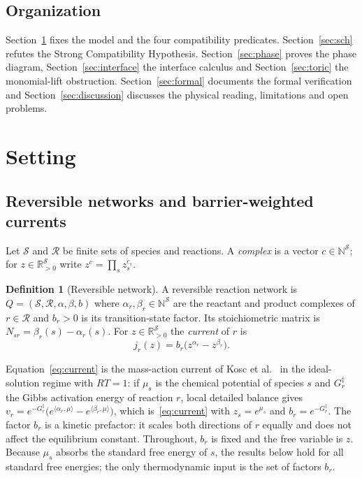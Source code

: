 \documentclass[11pt,a4paper]{article}
\theoremstyle{plain}
\theoremstyle{definition}
\newtheorem{definition}[theorem]{Definition}
\theoremstyle{remark}
\newcommand{\R}{\mathbb{R}}
\newcommand{\N}{\mathbb{N}}
\newcommand{\Rpos}{\R_{>0}}
\newcommand{\cS}{\mathcal{S}}
\newcommand{\cR}{\mathcal{R}}
\begin{document}
\subsection{Organization}

Section~\ref{sec:setting} fixes the model and the four compatibility predicates. Section~\ref{sec:sch} refutes the Strong Compatibility Hypothesis. Section~\ref{sec:phase} proves the phase diagram, Section~\ref{sec:interface} the interface calculus and Section~\ref{sec:toric} the monomial-lift obstruction. Section~\ref{sec:formal} documents the formal verification and Section~\ref{sec:discussion} discusses the physical reading, limitations and open problems.

\section{Setting}\label{sec:setting}

\subsection{Reversible networks and barrier-weighted currents}

Let $\cS$ and $\cR$ be finite sets of species and reactions. A \emph{complex} is a vector $c\in\N^{\cS}$; for $z\in\Rpos^{\cS}$ write $z^{c}=\prod_{s}z_s^{c_s}$.

\begin{definition}[Reversible network]\label{def:crn}
A reversible reaction network is $Q=(\cS,\cR,\alpha,\beta,b)$ where $\alpha_r,\beta_r\in\N^{\cS}$ are the reactant and product complexes of $r\in\cR$ and $b_r>0$ is its transition-state factor. Its stoichiometric matrix is $N_{sr}=\beta_r(s)-\alpha_r(s)$. For $z\in\Rpos^{\cS}$ the \emph{current} of $r$ is
\begin{equation}\label{eq:current}
  j_r(z)=b_r\bigl(z^{\alpha_r}-z^{\beta_r}\bigr).
\end{equation}
\end{definition}

Equation~\eqref{eq:current} is the mass-action current of Kosc et al.\ \citep[Eq.~5]{kosc2025} in the ideal-solution regime with $RT=1$: if $\mu_s$ is the chemical potential of species $s$ and $G_r^{\ddagger}$ the Gibbs activation energy of reaction $r$, local detailed balance gives $v_r=e^{-G_r^{\ddagger}}\bigl(e^{\langle\alpha_r,\mu\rangle}-e^{\langle\beta_r,\mu\rangle}\bigr)$, which is~\eqref{eq:current} with $z_s=e^{\mu_s}$ and $b_r=e^{-G_r^{\ddagger}}$. The factor $b_r$ is a kinetic prefactor: it scales both directions of $r$ equally and does not affect the equilibrium constant. Throughout, $b_r$ is fixed and the free variable is $z$. Because $\mu_s$ absorbs the standard free energy of $s$, the results below hold for all standard free energies; the only thermodynamic input is the set of factors $b_r$.
\end{document}
